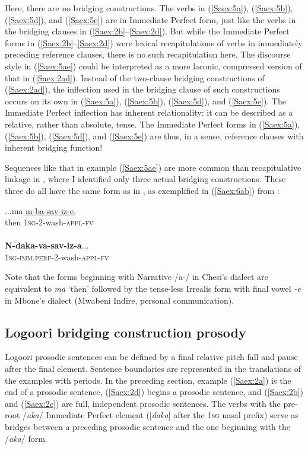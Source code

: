 \documentclass[output=paper]{LSP/langsci}
\begin{document}
Here, there are no bridging constructions. The verbs in (\ref{Saex:5a}), (\ref{Saex:5b}), (\ref{Saex:5d}), and (\ref{Saex:5e}) are in Immediate Perfect form, just like the verbs in the bridging clauses in (\ref{Saex:2b}--\ref{Saex:2d}). But while the Immediate Perfect forms in (\ref{Saex:2b}--\ref{Saex:2d}) were lexical recapitulations of verbs in immediately preceding reference clauses, there is no such recapitulation here. The discourse style in (\ref{Saex:5ae}) could be interpreted as a more laconic, compressed version of that in (\ref{Saex:2ad}). Instead of the two-clause bridging constructions of (\ref{Saex:2ad}), the inflection used in the bridging clause of such constructions occurs on its own in (\ref{Saex:5a}), (\ref{Saex:5b}), (\ref{Saex:5d}), and (\ref{Saex:5e}). The Immediate Perfect inflection has inherent relationality: it can be described as a relative, rather than absolute, tense. The Immediate Perfect forms in (\ref{Saex:5a}), (\ref{Saex:5b}), (\ref{Saex:5d}), and (\ref{Saex:5e}) are thus, in a sense, reference clauses with inherent bridging function!

Sequences like that in example (\ref{Saex:5ae}) are more common than recapitulative linkage in \citet{Mbone2014}, where I identified only three actual bridging constructions. These three do all have the same form as in \citet{Chesi2014}, as exemplified in (\ref{Saex:6ab}) from \citet{Mbone2014}:


\begin{exe}
\ex \label{Saex:6ab}
\begin{xlist}
\ex \label{Saex:6a}
\gll ...ma  \underline{m-ba-sav-iz-e}. \\
then  \textsc{1sg}-2-wash-\textsc{appl-fv}\\
\glt {}\\
\ex \label{Saex:6b}
\gll \textbf{N-daka-va-sav-iz-a}...\\     	       
    \textsc{1sg-imm.perf-}2-wash-\textsc{appl-fv}\\
\glt {} 
\end{xlist}
\end{exe}

Note that the forms beginning with Narrative /a-/ in Chesi’s dialect are equivalent to \textit{ma} `then' followed by the tense-less Irrealis form with final vowel \textit{-e} in Mbone’s dialect (Mwabeni Indire, personal communication).
%
\subsection{Logoori bridging construction prosody}
\label{Saprosody}
Logoori prosodic sentences can be defined by a final relative pitch fall and pause after the final element. Sentence boundaries are represented in the translations of the examples with periods. In the preceding section, example (\ref{Saex:2a}) is the end of a prosodic sentence, (\ref{Saex:2d}) begins a prosodic sentence, and (\ref{Saex:2b}) and (\ref{Saex:2c}) are full, independent prosodic sentences. The verbs with the pre-root /\textit{aka}/ Immediate Perfect element ([\textit{daka}] after the \textsc{1sg} nasal prefix) serve as bridges between a preceding prosodic sentence and the one beginning with the /\textit{aka}/ form. 
\end{document}
